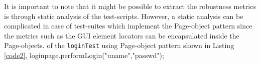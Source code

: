 \begin{Large}
It is important to note that it might be possible to extract the robustness metrics is through static analysis of the test-scripts. However, a static analysis can be complicated in case of test-suites which implement the Page-object pattern since the metrics such as the GUI element locators can be encapsulated inside the Page-objects.  of the \texttt{loginTest} using Page-object pattern shown in Listing \ref{code2}, loginpage.performLogin("uname","passwd"); 
\end{Large}











